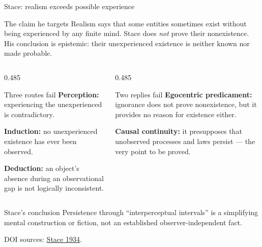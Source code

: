 \documentclass{beamer}
\newcommand{\doiref}[2]{%
  \href{https://doi.org/#1}{\textcolor{blue!65!black}{#2}}}
\newcommand{\sourcefoot}[1]{%
  \par\vfill{\tiny\color{black!60}DOI sources: #1\par}}
\begin{document}
\begin{frame}{Stace: realism exceeds possible experience}
\footnotesize
\begin{block}{The claim he targets}
Realism says that some entities sometimes exist without being experienced by
any finite mind. Stace does \emph{not} prove their nonexistence. His conclusion
is epistemic: their unexperienced existence is neither known nor made probable.
\end{block}

\begin{columns}[T,onlytextwidth]
\begin{column}{0.485\textwidth}
\begin{exampleblock}{Three routes fail}
\textbf{Perception:} experiencing the unexperienced is contradictory.
\par\smallskip
\textbf{Induction:} no unexperienced existence has ever been observed.
\par\smallskip
\textbf{Deduction:} an object's absence during an observational gap is not
logically inconsistent.
\end{exampleblock}
\end{column}

\begin{column}{0.485\textwidth}
\begin{exampleblock}{Two replies fail}
\textbf{Egocentric predicament:} ignorance does not prove nonexistence, but it
provides no reason for existence either.
\par\smallskip
\textbf{Causal continuity:} it presupposes that unobserved processes and laws
persist --- the very point to be proved.
\end{exampleblock}
\end{column}
\end{columns}

\begin{alertblock}{Stace's conclusion}
Persistence through \enquote{interperceptual intervals} is a simplifying
mental construction or fiction, not an established observer-independent fact.
\end{alertblock}

\sourcefoot{\doiref{10.1093/mind/XLIII.170.145}{Stace 1934}.}
\end{frame}
\end{document}

